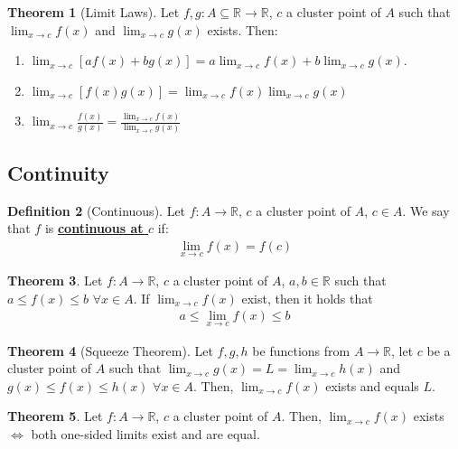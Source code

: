 \documentclass[reqno,11pt]{amsart}
\theoremstyle{definition}
\newtheorem{theorem}{Theorem}
\theoremstyle{definition}
\newtheorem{definition}[theorem]{Definition}
\theoremstyle{remark}
\newcommand{\R}{\mathbb{R}}
\newcommand{\dfn}[1]{\underline{\textbf{#1}}}
\begin{document}
\begin{theorem}[Limit Laws]
	Let $f, g: A \subseteq \R \rightarrow \R$, $c$ a cluster point of $A$ such that $\lim_{x \rightarrow c} f(x)$ and $\lim_{x \rightarrow c} g(x)$ exists. Then: 
	\begin{enumerate}[noitemsep]
		\item $\lim_{x \rightarrow c} [af(x) + bg(x)] = a \lim_{ x \rightarrow c} f(x) + b \lim_{x \rightarrow c} g(x)$.
		\item $\lim_{x \rightarrow c} [f(x)g(x)] = \lim_{x \rightarrow c} f(x) \lim_{x \rightarrow c} g(x) $
		\item $\lim_{x \rightarrow c} \frac{f(x)}{g(x)} = \frac{\lim_{x \rightarrow c} f(x)}{\lim_{x \rightarrow c} g(x)}$
	\end{enumerate}
\end{theorem}

\subsection{Continuity}
\begin{definition}[Continuous] 
	Let $f: A \rightarrow \R$, $c$ a cluster point of $A$, $c \in A$. We say that $f$ is \dfn{continuous at $c$} if: 
	\begin{align}
		\lim_{x \rightarrow c} f(x) = f(c)	
	\end{align}
\end{definition}

\begin{theorem}
	Let $f: A \rightarrow \R$, $c$ a cluster point of $A$, $a, b \in \R$ such that $a \leq f(x) \leq b$ $\forall x \in A$. If $\lim_{x \rightarrow c} f(x) $ exist, then it holds that
	\begin{align}
		a \leq \lim_{x \rightarrow c} f(x) \leq b 	
	\end{align}
\end{theorem}

\begin{theorem}[Squeeze Theorem]
	Let $f, g, h$ be functions from $A \rightarrow \R$, let $c $ be a cluster point of $A$ such that $\lim_{x \rightarrow c} g(x) = L = \lim_{x \rightarrow c} h(x)$ and $g(x) \leq f(x) \leq h(x)$ $\forall x \in A$. Then, $\lim_{x \rightarrow c} f(x)$ exists and equals $L$.	
\end{theorem}

\begin{theorem}
	Let $f: A \rightarrow \R$, $c$ a cluster point of $A$. Then, $\lim_{x \rightarrow c}f(x)$ exists $\iff$ both one-sided limits exist and are equal. 
\end{theorem}
\end{document}
